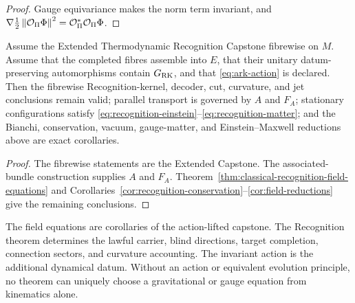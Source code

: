 \begin{proof}
Gauge equivariance makes the norm term invariant, and
$\nabla\tfrac12\left\lVert\mathcal O_\Pi\Phi\right\rVert^2
=\mathcal O_\Pi^*\mathcal O_\Pi\Phi$.
\end{proof}

\begin{theorem}
\label{thm:action-lifted-capstone}
Assume the Extended Thermodynamic Recognition Capstone fibrewise on $M$. Assume that the completed fibres assemble into $E$, that their unitary datum-preserving automorphisms contain $G_{\mathrm{RK}}$, and that \eqref{eq:ark-action} is declared. Then the fibrewise Recognition-kernel, decoder, cut, curvature, and jet conclusions remain valid; parallel transport is governed by $A$ and $F_A$; stationary configurations satisfy \eqref{eq:recognition-einstein}--\eqref{eq:recognition-matter}; and the Bianchi, conservation, vacuum, gauge-matter, and Einstein--Maxwell reductions above are exact corollaries.
\end{theorem}

\begin{proof}
The fibrewise statements are the Extended Capstone. The associated-bundle construction supplies $A$ and $F_A$. Theorem~\ref{thm:classical-recognition-field-equations} and Corollaries~\ref{cor:recognition-conservation}--\ref{cor:field-reductions} give the remaining conclusions.
\end{proof}

\begin{remark}
The field equations are corollaries of the action-lifted capstone. The Recognition theorem determines the lawful carrier, blind directions, target completion, connection sectors, and curvature accounting. The invariant action is the additional dynamical datum. Without an action or equivalent evolution principle, no theorem can uniquely choose a gravitational or gauge equation from kinematics alone.
\end{remark}
